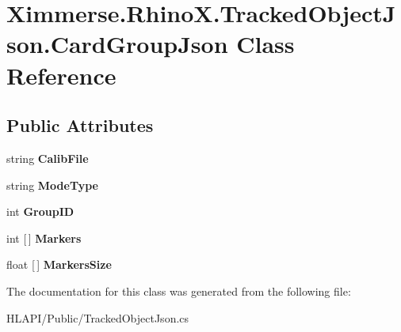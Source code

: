 \hypertarget{class_ximmerse_1_1_rhino_x_1_1_tracked_object_json_1_1_card_group_json}{}\section{Ximmerse.\+Rhino\+X.\+Tracked\+Object\+Json.\+Card\+Group\+Json Class Reference}
\label{class_ximmerse_1_1_rhino_x_1_1_tracked_object_json_1_1_card_group_json}
\subsection*{Public Attributes}
\begin{DoxyCompactItemize}
\item 
\mbox{\label{class_ximmerse_1_1_rhino_x_1_1_tracked_object_json_1_1_card_group_json_a5f31de6baa714b3f23c858ddf627afe1}} 
string {\bfseries Calib\+File}
\item 
\mbox{\label{class_ximmerse_1_1_rhino_x_1_1_tracked_object_json_1_1_card_group_json_ab6f414b2d3dec5cbb3cd9d6074bb9499}} 
string {\bfseries Mode\+Type}
\item 
\mbox{\label{class_ximmerse_1_1_rhino_x_1_1_tracked_object_json_1_1_card_group_json_a6e53696fe2fb2794768f581234e3246c}} 
int {\bfseries Group\+ID}
\item 
\mbox{\label{class_ximmerse_1_1_rhino_x_1_1_tracked_object_json_1_1_card_group_json_aab995bd10c5775dacb54eadb0a1601e7}} 
int \mbox{[}$\,$\mbox{]} {\bfseries Markers}
\item 
\mbox{\label{class_ximmerse_1_1_rhino_x_1_1_tracked_object_json_1_1_card_group_json_a917db29e1342780c1993a18d4184f143}} 
float \mbox{[}$\,$\mbox{]} {\bfseries Markers\+Size}
\end{DoxyCompactItemize}


The documentation for this class was generated from the following file\+:\begin{DoxyCompactItemize}
\item 
H\+L\+A\+P\+I/\+Public/Tracked\+Object\+Json.\+cs\end{DoxyCompactItemize}
